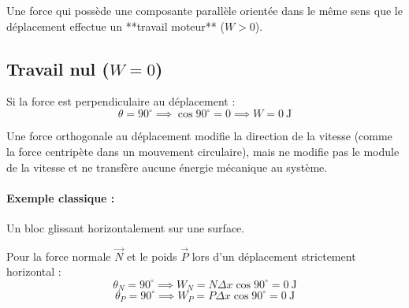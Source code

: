 \documentclass[11pt,openany]{book}
\begin{document}
\begin{idee}
Une force qui possède une composante parallèle orientée dans le même sens que le déplacement effectue un **travail moteur** ($W > 0$).
\end{idee}

\subsection{Travail nul ($W = 0$)}

Si la force est perpendiculaire au déplacement :
\[
\theta = 90^\circ \implies \cos 90^\circ = 0 \implies \boxed{W = 0\ \mathrm{J}}
\]

Une force orthogonale au déplacement modifie la direction de la vitesse (comme la force centripète dans un mouvement circulaire), mais ne modifie pas le module de la vitesse et ne transfère aucune énergie mécanique au système.

\paragraph{Exemple classique :} Un bloc glissant horizontalement sur une surface.

\begin{center}
\end{center}

Pour la force normale $\vec{N}$ et le poids $\vec{P}$ lors d'un déplacement strictement horizontal :
\[
\theta_N = 90^\circ \implies W_N = N \Delta x \cos 90^\circ = 0\ \mathrm{J}
\]
\[
\theta_P = 90^\circ \implies W_P = P \Delta x \cos 90^\circ = 0\ \mathrm{J}
\]
\end{document}
